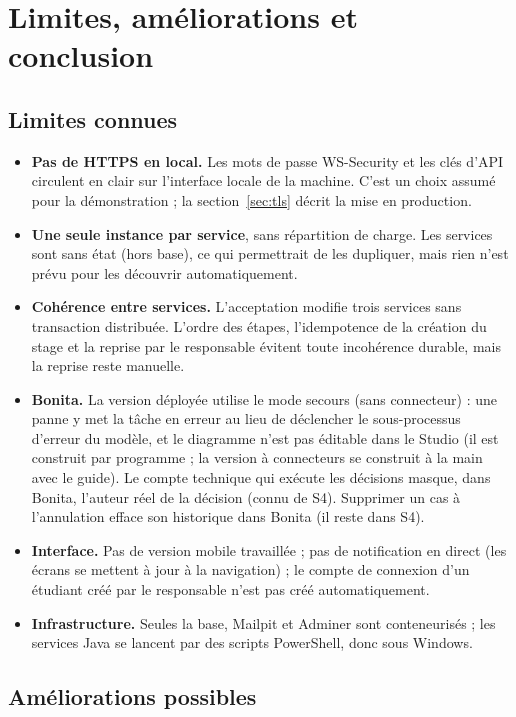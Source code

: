 \chapter{Limites, améliorations et conclusion}\label{chap:conclusion}

\section{Limites connues}

\begin{itemize}
  \item \textbf{Pas de HTTPS en local.} Les mots de passe WS-Security et les clés d'API circulent en clair sur l'interface locale de la machine. C'est un choix assumé pour la démonstration ; la section~\ref{sec:tls} décrit la mise en production.
  \item \textbf{Une seule instance par service}, sans répartition de charge. Les services sont sans état (hors base), ce qui permettrait de les dupliquer, mais rien n'est prévu pour les découvrir automatiquement.
  \item \textbf{Cohérence entre services.} L'acceptation modifie trois services sans transaction distribuée. L'ordre des étapes, l'idempotence de la création du stage et la reprise par le responsable évitent toute incohérence durable, mais la reprise reste manuelle.
  \item \textbf{Bonita.} La version déployée utilise le mode secours (sans connecteur) : une panne y met la tâche en erreur au lieu de déclencher le sous-processus d'erreur du modèle, et le diagramme n'est pas éditable dans le Studio (il est construit par programme ; la version à connecteurs se construit à la main avec le guide). Le compte technique qui exécute les décisions masque, dans Bonita, l'auteur réel de la décision (connu de S4). Supprimer un cas à l'annulation efface son historique dans Bonita (il reste dans S4).
  \item \textbf{Interface.} Pas de version mobile travaillée ; pas de notification en direct (les écrans se mettent à jour à la navigation) ; le compte de connexion d'un étudiant créé par le responsable n'est pas créé automatiquement.
  \item \textbf{Infrastructure.} Seules la base, Mailpit et Adminer sont conteneurisés ; les services Java se lancent par des scripts PowerShell, donc sous Windows.
\end{itemize}

\section{Améliorations possibles}

